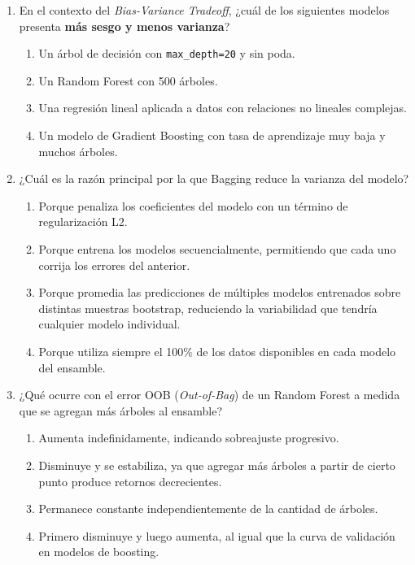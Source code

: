 \documentclass[11pt,a4paper]{article}
\begin{document}
\begin{enumerate}[label=\textbf{\arabic*.}, leftmargin=*, itemsep=20pt]
\item En el contexto del \textit{Bias-Variance Tradeoff}, ¿cu\'al de los siguientes modelos presenta \textbf{m\'as sesgo y menos varianza}?

\begin{enumerate}[label=\alph*)]
  \item Un \'arbol de decisi\'on con \texttt{max\_depth=20} y sin poda.
  \item Un Random Forest con 500 \'arboles.
  \item Una regresi\'on lineal aplicada a datos con relaciones no lineales complejas.
  \item Un modelo de Gradient Boosting con tasa de aprendizaje muy baja y muchos \'arboles.
\end{enumerate}

\item ¿Cu\'al es la raz\'on principal por la que Bagging reduce la varianza del modelo?

\begin{enumerate}[label=\alph*)]
  \item Porque penaliza los coeficientes del modelo con un t\'ermino de regularizaci\'on L2.
  \item Porque entrena los modelos secuencialmente, permitiendo que cada uno corrija los errores del anterior.
  \item Porque promedia las predicciones de m\'ultiples modelos entrenados sobre distintas muestras bootstrap, reduciendo la variabilidad que tendr\'ia cualquier modelo individual.
  \item Porque utiliza siempre el 100\% de los datos disponibles en cada modelo del ensamble.
\end{enumerate}

\item ¿Qu\'e ocurre con el error OOB (\textit{Out-of-Bag}) de un Random Forest a medida que se agregan m\'as \'arboles al ensamble?

\begin{enumerate}[label=\alph*)]
  \item Aumenta indefinidamente, indicando sobreajuste progresivo.
  \item Disminuye y se estabiliza, ya que agregar m\'as \'arboles a partir de cierto punto produce retornos decrecientes.
  \item Permanece constante independientemente de la cantidad de \'arboles.
  \item Primero disminuye y luego aumenta, al igual que la curva de validaci\'on en modelos de boosting.
\end{enumerate}


\end{enumerate}
\end{document}

